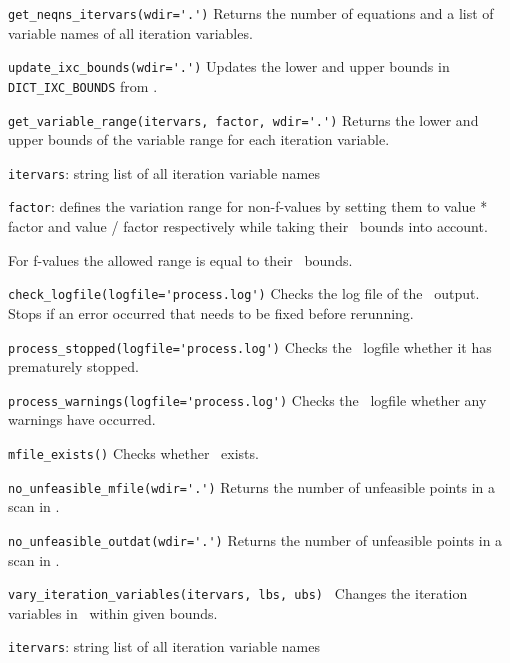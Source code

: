 \begin{description}

\item{\verb|get_neqns_itervars(wdir='.')| } Returns the number of equations
  and a list of variable names of all iteration variables.

\item{\verb|update_ixc_bounds(wdir='.')|} Updates the lower and upper bounds
  in \verb|DICT_IXC_BOUNDS| from \indat.

\item{\verb|get_variable_range(itervars, factor, wdir='.')|} Returns the lower
  and upper bounds of the variable range for each iteration variable.

  \texttt{itervars}: string list of all iteration variable names

  \texttt{factor}: defines the variation range for non-f-values by setting
  them to value * factor and value / factor respectively while taking their
  \process\ bounds into account.

  For f-values the allowed range is equal to their \process\ bounds.

\item{\verb|check_logfile(logfile='process.log')|} Checks the log file of the
  \process\ output.  Stops if an error occurred that needs to be fixed before
  rerunning.

\item{\verb|process_stopped(logfile='process.log')|} Checks the \process\
  logfile whether it has prematurely stopped.

\item{\verb|process_warnings(logfile='process.log')|} Checks the \process\
  logfile whether any warnings have occurred.

\item{\verb|mfile_exists()|} Checks whether \mfile\ exists.

\item{\verb|no_unfeasible_mfile(wdir='.')|} Returns the number of unfeasible
  points in a scan in \mfile.

\item{\verb|no_unfeasible_outdat(wdir='.')|} Returns the number of unfeasible
  points in a scan in \outdat.

\item{\verb|vary_iteration_variables(itervars, lbs, ubs) |} Changes the
  iteration variables in \indat\ within given bounds.

  \texttt{itervars}: string list of all iteration variable names


\end{description}
